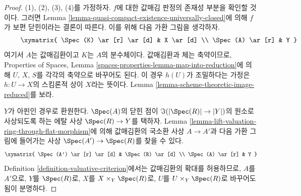 \begin{proof}
(1), (2), (3), (4)를 가정하자. $f$에 대한 값매김 판정의 존재성 부분을
확인할 것이다. 그러면 Lemma
\ref{lemma-quasi-compact-existence-universally-closed}에 의해 $f$가 보편
닫힌이라는 결론이 따른다. 이를 위해 다음 가환 그림을 생각하자.
\begin{equation}
\label{equation-start-with}
\vcenter{
\xymatrix{
\Spec(K) \ar[r] \ar[d] & X \ar[d] \\
\Spec(A) \ar[r] & Y
}
}
\end{equation}
여기서 $A$는 값매김환이고 $K$는 $A$의 분수체이다. 값매김환과 체는
축약이므로, Properties of Spaces, Lemma
\ref{spaces-properties-lemma-map-into-reduction}에 의해 $U$, $X$, $S$를
각각의 축약으로 바꾸어도 된다. 이 경우 $h(U)$가 조밀하다는 가정은
$h : U \to X$의 스킴론적 상이 $X$라는 뜻이다. Lemma
\ref{lemma-scheme-theoretic-image-reduced}를 보라.

\medskip\noindent
$Y$가 아핀인 경우로 환원한다. $\Spec(A)$의 닫힌 점이
$\Im(|\Spec(R)| \to |Y|)$의 원소로 사상되도록 하는 에탈 사상
$\Spec(R) \to Y$를 택하자. Lemma
\ref{lemma-lift-valuation-ring-through-flat-morphism}에 의해 값매김환의
국소환 사상 $A \to A'$과 다음 가환 그림에 들어가는 사상
$\Spec(A') \to \Spec(R)$를 찾을 수 있다.
$$
\xymatrix{
\Spec(A') \ar[r] \ar[d] & \Spec(R) \ar[d] \\
\Spec(A) \ar[r] & Y
}
$$
Definition \ref{definition-valuative-criterion}에서는 값매김환의 확대를
허용하므로, $A$를 $A'$으로, $Y$를 $\Spec(R)$로, $X$를
$X \times_Y \Spec(R)$로, $U$를 $U \times_Y \Spec(R)$로 바꾸어도 됨이
분명하다.


\end{proof}
